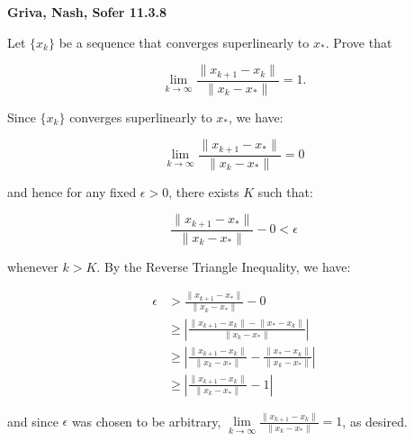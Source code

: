\textbf{Griva, Nash, Sofer 11.3.8}

Let $\{ x_k \}$ be a sequence that converges superlinearly to $x_*$. Prove that 

$$
\lim\limits_{k \to \infty} \frac{\lVert x_{k+1} - x_k \rVert}{\lVert x_k - x_* \rVert} = 1.
$$

\begin{solution}
    Since $\{x_k\}$ converges superlinearly to $x_*$, we have:

    $$
    \lim\limits_{k \to \infty}{\frac{\lVert x_{k+1} - x_* \rVert}{ \lVert x_k - x_* \rVert}} = 0
    $$

    and hence for any fixed $\epsilon > 0$, there exists $K$ such that:

    $$
    \frac{\lVert x_{k+1} - x_* \rVert}{\lVert x_k - x_* \rVert} - 0 < \epsilon
    $$

    whenever $k > K$. By the Reverse Triangle Inequality, we have: 

    \begin{align*}
    \epsilon &> \frac{\lVert x_{k+1} - x_* \rVert}{\lVert x_k - x_* \rVert} - 0 \\
             &\ge \left\lvert \frac{\lVert x_{k+1} - x_k \rVert - \lVert x_* - x_k \rVert}{\lVert x_k - x_* \rVert} \right\rvert \\
             &\ge \left\lvert \frac{\lVert x_{k+1} - x_k \rVert}{\lVert x_k - x_* \rVert} - \frac{\lVert x_* - x_k \rVert}{\lVert x_k - x_* \rVert} \right\rvert \\
             &\ge \left\lvert \frac{\lVert x_{k+1} - x_k \rVert}{\lVert x_k - x_* \rVert} - 1 \right\rvert
    \end{align*}

    and since $\epsilon$ was chosen to be arbitrary, 
    $\lim\limits_{k \to \infty} \frac{\lVert x_{k+1} - x_k \rVert}{\lVert x_k - x_* \rVert} = 1$, as desired.
    \ \\
\end{solution}

